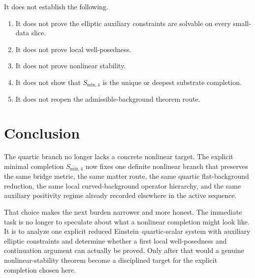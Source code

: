 \documentclass[11pt]{article}
\begin{document}
It does not establish the following.
\begin{enumerate}
    \item It does not prove the elliptic auxiliary constraints are solvable on every small-data slice.
    \item It does not prove local well-posedness.
    \item It does not prove nonlinear stability.
    \item It does not show that \(S_{\mathrm{min},4}\) is the unique or deepest substrate completion.
    \item It does not reopen the admissible-background theorem route.
\end{enumerate}

\section{Conclusion}

The quartic branch no longer lacks a concrete nonlinear target. The explicit minimal completion \(S_{\mathrm{min},4}\) now fixes one definite nonlinear branch that preserves the same bridge metric, the same matter route, the same quartic flat-background reduction, the same local curved-background operator hierarchy, and the same auxiliary positivity regime already recorded elsewhere in the active sequence.

That choice makes the next burden narrower and more honest. The immediate task is no longer to speculate about what a nonlinear completion might look like. It is to analyze one explicit reduced Einstein--quartic-scalar system with auxiliary elliptic constraints and determine whether a first local well-posedness and continuation argument can actually be proved. Only after that would a genuine nonlinear-stability theorem become a disciplined target for the explicit completion chosen here.
\end{document}

